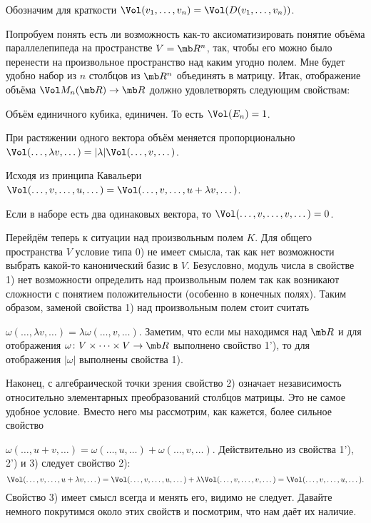 Обозначим для краткости $\Vol(v_1,\dots,v_n)= \Vol (D(v_1,\dots,v_n))$. 

Попробуем понять есть ли возможность как-то аксиоматизировать понятие объёма параллелепипеда на пространстве $V=\mb R^n$, так, чтобы его можно было перенести на произвольное пространство над каким угодно полем. Мне будет удобно набор из $n$  столбцов из $\mb R^n$ объединять в матрицу. Итак, отображение объёма $\Vol M_n(\mb R) \to \mb R$ должно удовлетворять следующим свойствам:
\enm 
\setcounter{enumi}{-1}
\item Объём единичного кубика, единичен. То есть $\Vol(E_n)=1$.
\item При растяжении одного вектора объём меняется пропорционально $\Vol(\dots,\lambda v,\dots)=|\lambda|\Vol(\dots,v,\dots)$.
\item Исходя из принципа Кавальери $\Vol(\dots,v,\dots,u,\dots)=\Vol(\dots,v,\dots,u+\lambda v,\dots)$.
\item Если в наборе есть два одинаковых вектора, то $\Vol(\dots,v, \dots, v,\dots)=0$.
\eenm

Перейдём теперь к ситуации над произвольным полем $K$.
Для общего пространства $V$ условие типа 0) не имеет смысла, так как нет возможности выбрать какой-то канонический базис в $V$. Безусловно, модуль числа в свойстве 1) нет возможности определить над произвольным полем так как  возникают сложности с понятием положительности (особенно в конечных полях). Таким образом, заменой свойства 1) над произвольным полем стоит считать
\enm
\item[1')] $\omega(\dots,\lambda v,\dots)=\lambda \omega(\dots,v,\dots)$.
\eenm
Заметим, что если мы находимся над $\mb R$ и  для отображения $\omega \colon V \times \dots \times V \to \mb R$ выполнено свойство  1'), то для отображения $|\omega|$ выполнены свойства 1). 

Наконец, с алгебраической точки зрения свойство 2) означает независимость относительно элементарных преобразований столбцов матрицы. Это не самое удобное условие. Вместо него мы рассмотрим, как кажется, более сильное свойство
\enm \item[2')] $\omega(\dots,u+v,\dots)=\omega(\dots,u,\dots)+\omega(\dots,v,\dots)$.
\eenm
Действительно из свойства 1'), 2') и 3) следует свойство 2): $$\Vol(\dots,v,\dots,u+\lambda v,\dots)= \Vol(\dots,v,\dots,u,\dots)+\lambda \Vol(\dots,v,\dots,v,\dots)=\Vol(\dots,v,\dots,u,\dots).$$
Свойство 3) имеет смысл всегда и менять его, видимо не следует. Давайте немного покрутимся около этих свойств и посмотрим, что нам даёт их наличие.


